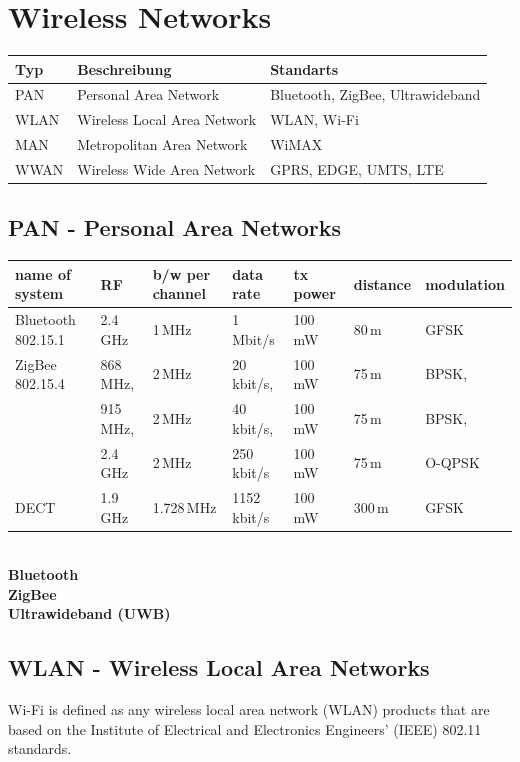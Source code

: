 \section{Wireless Networks}
\begin{tabular}{|l|l|l|}
	\hline
	\textbf{Typ} & \textbf{Beschreibung} & \textbf{Standarts}\\
	\hline
	PAN & Personal Area Network & Bluetooth, ZigBee, Ultrawideband\\
	\hline
	WLAN & Wireless Local Area Network & WLAN, Wi-Fi\\
	\hline
	MAN & Metropolitan Area Network & WiMAX\\
	\hline
	WWAN & Wireless Wide Area Network & GPRS, EDGE, UMTS, LTE\\
	\hline
\end{tabular}
\subsection{PAN - Personal Area Networks }
\begin{tabular}{|l|l|l|l|l|l|l|} \hline
name of system & RF & b/w per channel & data rate  & tx power	& distance  & modulation  \\
\hline \hline
Bluetooth 802.15.1 & 2.4\,GHz	& 1\,MHz	& 1\,Mbit/s	      & 100\,mW	 & 80\,m	& GFSK \\ \hline
ZigBee 802.15.4	   & 868\,MHz,& 2\,MHz	& 20\,kbit/s,     & 100\,mW  & 75\,m	& BPSK, \\
              	   & 915\,MHz,& 2\,MHz	& 40\,kbit/s,     & 100\,mW  & 75\,m	& BPSK,  \\
                   & 2.4\,GHz & 2\,MHz	& 250\,kbit/s     & 100\,mW  & 75\,m	& O-QPSK \\ \hline
DECT	             & 1.9\,GHz	& 1.728\,MHz & 1152\,kbit/s	& 100\,mW	 & 300\,m	& GFSK \\ \hline
\end{tabular}\\

\textbf{Bluetooth }\\
\textbf{ZigBee }\\
\textbf{Ultrawideband (UWB)}

\subsection{WLAN - Wireless Local Area Networks}
Wi-Fi is defined as any wireless local area network (WLAN) products that are based on the Institute of Electrical and Electronics Engineers' (IEEE) 802.11 standards. \\

